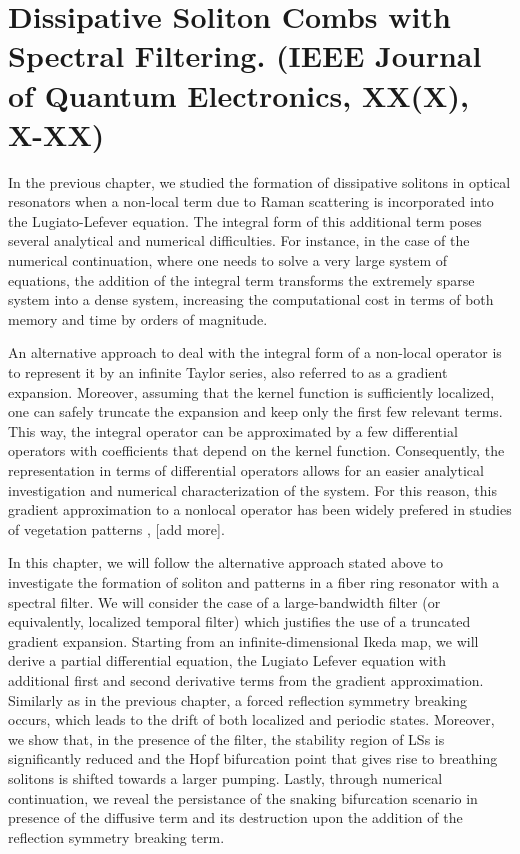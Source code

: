 \chapter{Dissipative Soliton Combs with Spectral Filtering. (IEEE Journal of Quantum Electronics, XX(X), X-XX)}

In the previous chapter, we studied the formation of dissipative solitons in optical
resonators when a non-local
term due to Raman scattering is incorporated into the Lugiato-Lefever equation. The
integral form of this additional term poses several analytical and numerical difficulties.
For instance, in the case of the numerical continuation, where one needs to solve a very
large system of equations, the addition of the integral term transforms the extremely sparse
system into a dense system, increasing the computational cost in terms of both memory and time
by orders of magnitude.

An alternative approach to deal with the integral form of a non-local operator is to represent
it by an infinite Taylor series, also referred to as a gradient expansion. Moreover, 
assuming that the kernel function is sufficiently localized, one can safely truncate the expansion
and keep only the first few relevant terms. This way, the integral operator can be
approximated by a few differential operators with coefficients that depend on
the kernel function. Consequently, the representation in terms of differential operators
allows for an easier analytical investigation and numerical characterization of the system.
For this reason, this gradient approximation to a nonlocal operator has been widely 
prefered in studies of vegetation patterns \cite{lefever1997origin}, [add more].

In this chapter, we will follow the alternative approach stated above to investigate
the formation of soliton and patterns in a fiber ring resonator with a spectral filter. 
We will consider the case of a large-bandwidth filter (or equivalently, localized temporal filter)
which justifies the use of a truncated gradient expansion. Starting from an infinite-dimensional
Ikeda map, we will derive a partial differential equation, the Lugiato Lefever equation with additional
first and second derivative terms from the gradient approximation. Similarly as in the previous chapter,
a forced reflection symmetry breaking occurs, which leads to the drift of both localized and periodic states.
Moreover, we show that, in the presence of the filter, the stability region of LSs is significantly reduced
and the Hopf bifurcation point that gives rise to breathing solitons is shifted towards a larger pumping.
Lastly, through numerical continuation, we reveal the persistance of the snaking bifurcation scenario in
presence of the diffusive term and its destruction upon the addition of the reflection symmetry breaking term.

